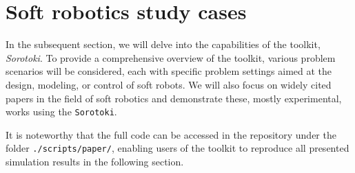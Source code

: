 
\section{Soft robotics study cases}
\label{sec:C5:studycases}
In the subsequent section, we will delve into the capabilities of the toolkit, \textit{Sorotoki}. To provide a comprehensive overview of the toolkit, various problem scenarios will be considered, each with specific problem settings aimed at the design, modeling, or control of soft robots. We will also focus on widely cited papers in the field of soft robotics and demonstrate these, mostly experimental, works using the \texttt{Sorotoki}.
\begin{rmk}
It is noteworthy that the full code can be accessed in the repository under the folder \texttt{./scripts/paper/}, enabling users of the toolkit to reproduce all presented simulation results in the following section.
\end{rmk}
%
